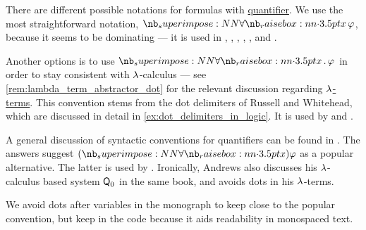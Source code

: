 \begin{remark}\label{rem:notation_for_quantifiers}
  There are different possible notations for formulas with \hyperref[def:predicate_logic_alphabet/quantifiers]{quantifier}. We use the most straightforward notation, \( \qforall x \varphi \), because it seems to be dominating --- it is used in
  \cite[ch. 2]{Hinman2005Logic},
  \cite[ch. II]{Kleene2002Logic},
  \cite[ch. IV]{Smullyan1995FOL},
  \cite[\S I.9]{КолмогоровДрагалин2006Логика},
  \cite[def. 2.1.6]{Герасимов2011Вычислимость},
  \cite[ch. 3]{ШеньВерещагин2017ЯзыкиИИсчисления} and
  \cite[ch. II]{Эдельман1975Логика}.

  Another options is to use \( \quantifier* \synforall x \varphi \) in order to stay consistent with \( {\mathrm \lambda} \)-calculus --- see \cref{rem:lambda_term_abstractor_dot} for the relevant discussion regarding \hyperref[def:lambda_term]{\( {\mathrm \lambda} \)-terms}. This convention stems from the dot delimiters of Russell and Whitehead, which are discussed in detail in \cref{ex:dot_delimiters_in_logic}. It is used by  and .

  A general discussion of syntactic conventions for quantifiers can be found in \cite{MathSE:standards_for_quantifier_notation}. The answers suggest \( (\synforall x) \varphi \) as a popular alternative. The latter is used by . Ironically, Andrews also discusses his \( {\mathrm \lambda} \)-calculus based system \hyperref[rem:simply_typed_hol]{\( \textsf{\upshape Q}_0 \)} in the same book, and avoids dots in his \( {\mathrm \lambda} \)-terms.

  We avoid dots after variables in the monograph to keep close to the popular convention, but keep in the code because it aids readability in monospaced text.
\end{remark}

